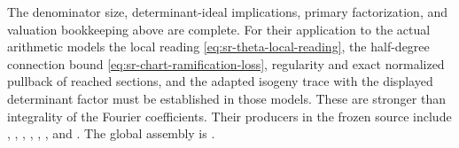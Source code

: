 The denominator size, determinant-ideal implications, primary
factorization, and valuation bookkeeping above are complete.
For their application to the actual arithmetic models the local
reading \eqref{eq:sr-theta-local-reading}, the half-degree
connection bound \eqref{eq:sr-chart-ramification-loss}, regularity
and exact normalized pullback of reached sections, and the adapted
isogeny trace with the displayed determinant factor must be
established in those models.
These are stronger than integrality of the Fourier coefficients.
Their producers in the frozen source include
,
,
,
,
,
, and
.
The global assembly is
.
